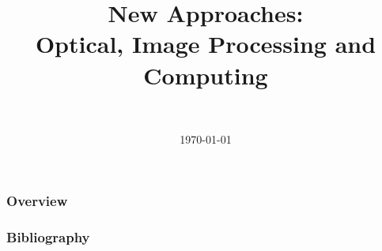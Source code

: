 \documentclass[]{beamer}
\title
[New Approaches: Optical, Image Processing, Computing]
{New Approaches:\\Optical, Image Processing and Computing}
\author[Daniel Topa]{\Topa \\ \TopaEmail}
\institute{\unmmath}
\date{\today}
\newcommand{\pGlobal}			{../../../global/}
\newcommand{\pGlobalSetup}		{\pGlobal setup-global/}
\begin{document}


\begin{frame}
	\titlepage
\end{frame}
	


\begin{frame}\frametitle{Overview}
	\tableofcontents[hideallsubsections]
\end{frame}

	
	
	
	


{\tiny{
\begin{frame}[allowframebreaks]\frametitle{Bibliography}
	\nocite{*}
	\printbibliography
\end{frame}}}

\begin{frame}
	\titlepage
\end{frame}
\end{document}
